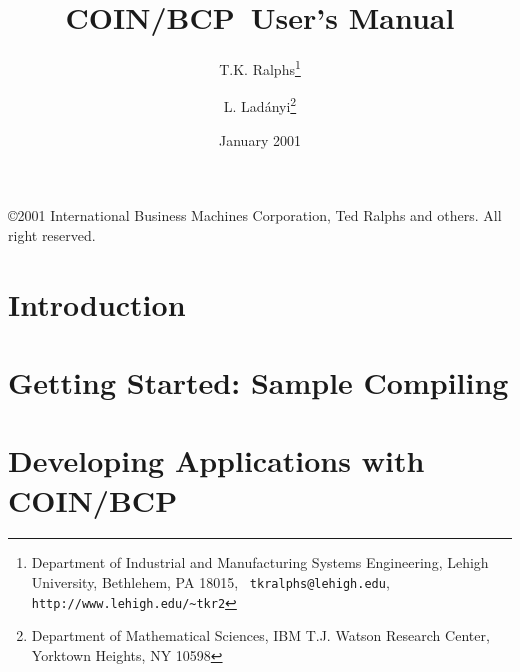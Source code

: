 \documentclass[openany,twoside,11pt]{book}
\newcommand{\BB}{{\sc COIN/BCP}}
\begin{document}
\title{\BB\ User's Manual}
\author{
T.K. Ralphs\thanks{Department of Industrial and Manufacturing Systems 
Engineering, Lehigh University, Bethlehem, PA 18015, {\tt
tkralphs@lehigh.edu}, {\tt http://www.lehigh.edu/\~{ }tkr2}} 
\and
L. Lad\'anyi\thanks{Department of Mathematical Sciences, 
IBM T.J. Watson Research Center, Yorktown Heights,
NY 10598} \\
}
\date{January 2001}
\maketitle

\newpage

\thispagestyle{empty}

\vspace*{3in}
\begin{center}
{\copyright 2001 International Business Machines Corporation, Ted
Ralphs and others. All right reserved.}
\end{center}

\newpage

\tableofcontents


\begin{tabbing}
\end{tabbing}


\chapter{Introduction}
\label{man-intro}



\chapter{Getting Started: Sample Compiling}
\label{getting-started}


\chapter{Developing Applications with \BB}
\label{development}

\end{document}
